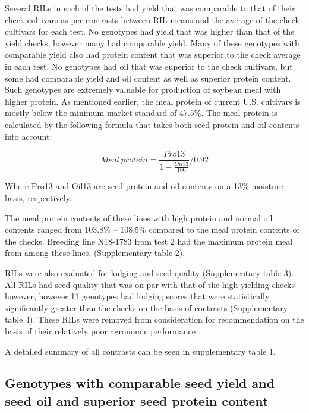 \documentclass[Agronomy,article,submit,moreauthors,pdftex]{mdpi}
\begin{document}
Several RILs in each of the tests had yield that was comparable to that
of their check cultivars as per contrasts between RIL means and the
average of the check cultivars for each test. No genotypes had yield
that was higher than that of the yield checks, however many had
comparable yield. Many of these genotypes with comparable yield also had
protein content that was superior to the check average in each test. No
genotypes had oil that was superior to the check cultivars, but some had
comparable yield and oil content as well as superior protein content.
Such genotypes are extremely valuable for production of soybean meal
with higher protein. As mentioned earlier, the meal protein of current
U.S. cultivars is mostly below the minimum market standard of 47.5\%.
The meal protein is calculated by the following formula that takes both
seed protein and oil contents into account:

\[Meal\ protein = \frac{Pro13}{1-\frac{Oil13}{100}}/0.92 \]

Where Pro13 and Oil13 are seed protein and oil contents on a 13\%
moisture basis,
respectively\citep{pantaloneRegistrationTN115102Soybean2018}.

The meal protein contents of these lines with high protein and normal
oil contents ranged from 103.8\% -- 108.5\% compared to the meal protein
contents of the checks. Breeding line N18-1783 from test 2 had the
maximum protein meal from among these lines. (Supplementary table 2).

RILs were also evaluated for lodging and seed quality (Supplementary
table 3). All RILs had seed quality that was on par with that of the
high-yielding checks however, however 11 genotypes had lodging scores
that were statistically significantly greater than the checks on the
basis of contrasts (Supplementary table 4). These RILs were removed from
consideration for recommendation on the basis of their relatively poor
agronomic performance

A detailed summary of all contrasts can be seen in supplementary table
1.

\hypertarget{genotypes-with-comparable-seed-yield-and-seed-oil-and-superior-seed-protein-content}{%
\subsection{Genotypes with comparable seed yield and seed oil and
superior seed protein
content}\label{genotypes-with-comparable-seed-yield-and-seed-oil-and-superior-seed-protein-content}}
\end{document}
